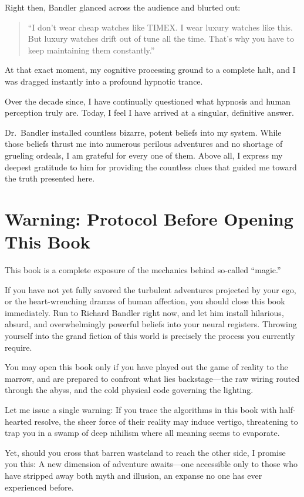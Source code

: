     Right then, Bandler glanced across the audience and blurted out:
    \begin{quote}
        ``I don't wear cheap watches like TIMEX. I wear luxury watches like this. But luxury watches drift out of tune all the time. That's why you have to keep maintaining them constantly.''
    \end{quote}

    At that exact moment, my cognitive processing ground to a complete halt, and I was dragged instantly into a profound hypnotic trance.

    Over the decade since, I have continually questioned what hypnosis and human perception truly are. Today, I feel I have arrived at a singular, definitive answer.

    Dr.~Bandler installed countless bizarre, potent beliefs into my system. While those beliefs thrust me into numerous perilous adventures and no shortage of grueling ordeals, I am grateful for every one of them. Above all, I express my deepest gratitude to him for providing the countless clues that guided me toward the truth presented here.

    \section*{Warning: Protocol Before Opening This Book}
    This book is a complete exposure of the mechanics behind so-called ``magic.''

    If you have not yet fully savored the turbulent adventures projected by your ego, or the heart-wrenching dramas of human affection, you should close this book immediately. Run to Richard Bandler right now, and let him install hilarious, absurd, and overwhelmingly powerful beliefs into your neural registers. Throwing yourself into the grand fiction of this world is precisely the process you currently require.

    You may open this book only if you have played out the game of reality to the marrow, and are prepared to confront what lies backstage—the raw wiring routed through the abyss, and the cold physical code governing the lighting.

    Let me issue a single warning:
    If you trace the algorithms in this book with half-hearted resolve, the sheer force of their reality may induce vertigo, threatening to trap you in a swamp of deep nihilism where all meaning seems to evaporate.

    Yet, should you cross that barren wasteland to reach the other side, I promise you this:
    A new dimension of adventure awaits—one accessible only to those who have stripped away both myth and illusion, an expanse no one has ever experienced before.
\fi

